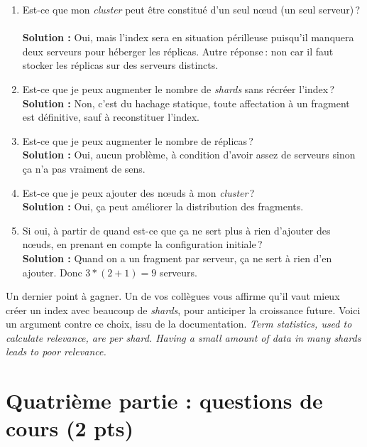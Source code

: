 \documentclass[11pt,a4paper]{article}
\newenvironment{solution}[0]{
~\\ \color{red} \textbf{Solution : }\color{black}}{%
}
\begin{document}
\begin{enumerate}
       \item Est-ce que mon \textit{cluster} peut être constitué d'un seul n{\oe}ud (un seul serveur)\,?
\begin{solution}
Oui, mais l'index sera en situation périlleuse puisqu'il manquera deux serveurs pour 
héberger les réplicas. Autre réponse\,: non car il faut stocker les réplicas sur des serveurs distincts.
\end{solution}

       \item Est-ce que je peux augmenter le nombre de \textit{shards} sans récréer l'index\,?
\begin{solution}
Non, c'est du hachage statique, toute affectation à un fragment est définitive, sauf à reconstituer l'index.
\end{solution}
       \item Est-ce que je peux augmenter le nombre de réplicas\,?
\begin{solution}
Oui, aucun problème, à condition d'avoir assez de serveurs sinon ça n'a pas vraiment de sens.
\end{solution}
       \item Est-ce que je peux ajouter des n{\oe}uds à mon \textit{cluster}\,?
\begin{solution}
Oui, ça peut améliorer la distribution des fragments.
\end{solution}
       \item Si oui, à partir de quand est-ce que ça ne sert plus à rien d'ajouter des n{\oe}uds, en prenant
            en compte la configuration initiale\,?
\begin{solution}
Quand on a un fragment par serveur, ça ne sert à rien d'en ajouter. Donc $3*(2+1)=9$ serveurs.
\end{solution}
    \end{enumerate}

Un dernier point à gagner. Un de vos collègues vous affirme qu'il vaut mieux
créer un index avec beaucoup de \textit{shards}, pour anticiper la croissance future. Voici
un argument contre ce choix, issu de la documentation.
\textit{Term statistics, used to calculate relevance, are per shard. Having a small amount of 
data in many shards leads to poor relevance.} 

\section*{Quatrième partie : questions de cours (2 pts)}
\end{document}
